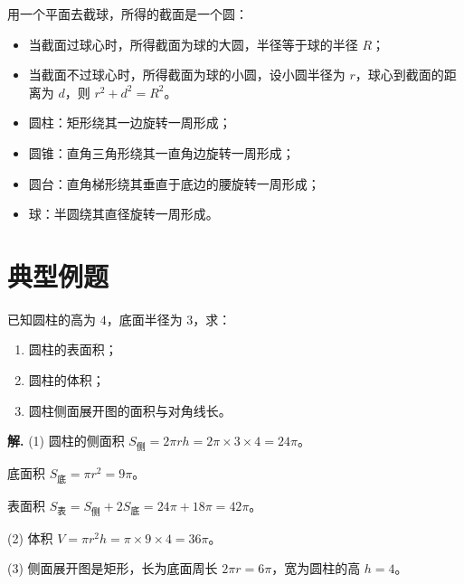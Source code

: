 \documentclass[11pt]{ctexrep}
\begin{document}
\begin{property}[球的截面性质]
    用一个平面去截球，所得的截面是一个圆：
    \begin{itemize}
        \item 当截面过球心时，所得截面为球的大圆，半径等于球的半径 $R$；
        \item 当截面不过球心时，所得截面为球的小圆，设小圆半径为 $r$，球心到截面的距离为 $d$，则 $r^2 + d^2 = R^2$。
    \end{itemize}
\end{property}

\begin{property}[旋转体的形成]
    \begin{itemize}
        \item 圆柱：矩形绕其一边旋转一周形成；
        \item 圆锥：直角三角形绕其一直角边旋转一周形成；
        \item 圆台：直角梯形绕其垂直于底边的腰旋转一周形成；
        \item 球：半圆绕其直径旋转一周形成。
    \end{itemize}
\end{property}

\section*{典型例题}

\begin{example}[圆柱的计算]
    已知圆柱的高为 $4$，底面半径为 $3$，求：
    \begin{enumerate}
        \item 圆柱的表面积；
        \item 圆柱的体积；
        \item 圆柱侧面展开图的面积与对角线长。
    \end{enumerate}
\end{example}

\textbf{解.} (1) 圆柱的侧面积 $S_{\text{侧}} = 2\pi rh = 2\pi \times 3 \times 4 = 24\pi$。

底面积 $S_{\text{底}} = \pi r^2 = 9\pi$。

表面积 $S_{\text{表}} = S_{\text{侧}} + 2S_{\text{底}} = 24\pi + 18\pi = 42\pi$。

(2) 体积 $V = \pi r^2 h = \pi \times 9 \times 4 = 36\pi$。

(3) 侧面展开图是矩形，长为底面周长 $2\pi r = 6\pi$，宽为圆柱的高 $h = 4$。
\end{document}
